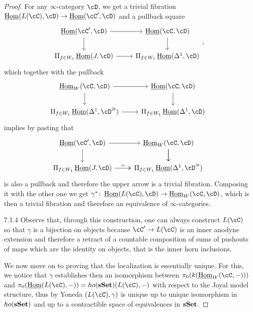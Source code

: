 \documentclass[a4paper,12pt]{scrartcl}
\begin{document}
\begin{proof}
  For any $\infty$-category $\cD$, we get a trivial fibration
  $\Home(L(\cC),\cD)\rightarrow\Home(\cC',\cD)$ and a pullback square
  \[\begin{tikzcd}
    {\Home(\cC',\cD)} & {\Home(\cC,\cD)} \\
    {\Pi_{f\in W_1}\Home(J,\cD)} & {\Pi_{f\in W_1}\Home(\Delta^1,\cD)}
    \arrow[from=1-2, to=2-2]
    \arrow[from=2-1, to=2-2]
    \arrow[from=1-1, to=2-1]
    \arrow[from=1-1, to=1-2]
  \end{tikzcd},\]
  which together with the pullback
  \[\begin{tikzcd}
    {\Home_W(\cC,\cD)} & {\Home(\cC,\cD)} \\
    {\Pi_{f\in W_1}\Home(\Delta^1,\cD^{\cong})} & {\Pi_{f\in W_1}\Home(\Delta^1,\cD)}
    \arrow[from=1-2, to=2-2]
    \arrow[from=2-1, to=2-2]
    \arrow[from=1-1, to=2-1]
    \arrow[from=1-1, to=1-2]
  \end{tikzcd}\]
  implies by pasting that
  \[\begin{tikzcd}
    {\Home(\cC',\cD)} & {\Home_W(\cC,\cD)} \\
    {\Pi_{f\in W_1}\Home(J,\cD)} & {\Pi_{f\in W_1}\Home(\Delta^1,\cD^{\cong})}
    \arrow[from=1-2, to=2-2]
    \arrow[from=1-1, to=1-2]
    \arrow[from=1-1, to=2-1]
    \arrow["\sim", two heads, from=2-1, to=2-2]
    \arrow[from=1-2, to=2-2]
  \end{tikzcd}\]
  is also a pullback and therefore the upper arrow is a trivial fibration.
  Composing it with the other one we get
  $\gamma^*\colon\Home(L(\cC),\cD)\rightarrow\Home_W(\cC,\cD)$, which is then a
  trivial fibration and therefore an equivalence of $\infty$-categories.

  7.1.4 Observe that, through this construction, one can always construct
  $L(\cC)$ so that $\gamma$ is a bijection on objects because $\cC'\rightarrow
  L(\cC)$ is an inner anodyne extension and therefore a retract of a countable
  composition of sums of pushouts of maps which are the identity on objects,
  that is the inner horn inclusions.

  We now move on to proving that the localization is essentially unique. For
  this, we notice that $\gamma$ establishes then an isomorphism between
  $\pi_0(k(\Home_W(\cC,-)))$ and $\pi_0(\Home(L(\cC),-))=ho(\sSet)(L(\cC),-)$
  with respect to the Joyal model structure, thus by Yoneda $(L(\cC),\gamma)$ is
  unique up to unique isomorphism in $ho(\operatorname{\mathbf{sSet}})$ and up to a contractible space
  of equivalences in $\operatorname{\mathbf{sSet}}$.
\end{proof}
\end{document}

